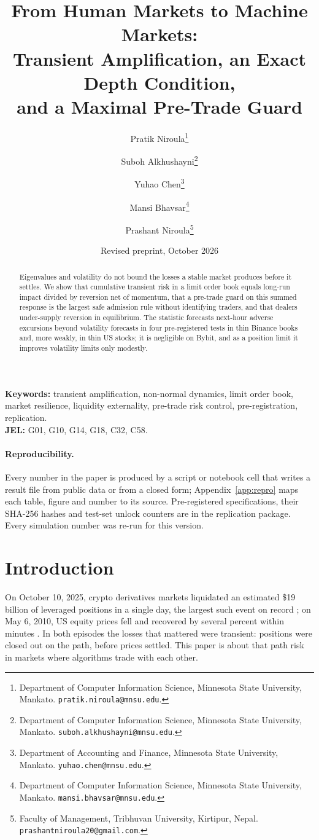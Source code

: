 \documentclass[12pt]{article}
\title{From Human Markets to Machine Markets:\\
Transient Amplification, an Exact Depth Condition,\\ and a Maximal Pre-Trade Guard}
\author{Pratik Niroula\thanks{Department of Computer Information Science, Minnesota State University, Mankato. \texttt{pratik.niroula@mnsu.edu}.}
\and Suboh Alkhushayni\thanks{Department of Computer Information Science, Minnesota State University, Mankato. \texttt{suboh.alkhushayni@mnsu.edu}.}
\and Yuhao Chen\thanks{Department of Accounting and Finance, Minnesota State University, Mankato. \texttt{yuhao.chen@mnsu.edu}.}
\and Mansi Bhavsar\thanks{Department of Computer Information Science, Minnesota State University, Mankato. \texttt{mansi.bhavsar@mnsu.edu}.}
\and Prashant Niroula\thanks{Faculty of Management, Tribhuvan University, Kirtipur, Nepal. \texttt{prashantniroula20@gmail.com}.}}
\date{Revised preprint, October 2026}
\theoremstyle{definition}
\theoremstyle{remark}
\begin{document}
\maketitle
\thispagestyle{empty}

\begin{abstract}
\noindent Eigenvalues and volatility do not bound the losses a stable market produces before it settles. We show that cumulative transient risk in a limit order book equals long-run impact divided by reversion net of momentum, that a pre-trade guard on this summed response is the largest safe admission rule without identifying traders, and that dealers under-supply reversion in equilibrium. The statistic forecasts next-hour adverse excursions beyond volatility forecasts in four pre-registered tests in thin Binance books and, more weakly, in thin US stocks; it is negligible on Bybit, and as a position limit it improves volatility limits only modestly.
\end{abstract}

\noindent\textbf{Keywords:} transient amplification, non-normal dynamics, limit order book, market resilience, liquidity externality, pre-trade risk control, pre-registration, replication.\\
\textbf{JEL:} G01, G10, G14, G18, C32, C58.

\paragraph{Reproducibility.} Every number in the paper is produced by a script or notebook cell that writes a result file from public data or from a closed form; Appendix~\ref{app:repro} maps each table, figure and number to its source. Pre-registered specifications, their SHA-256 hashes and test-set unlock counters are in the replication package. Every simulation number was re-run for this version.

\newpage
\setcounter{page}{1}

\section{Introduction}

On October 10, 2025, crypto derivatives markets liquidated an estimated \$19 billion of leveraged positions in a single day, the largest such event on record \citep{shares2025}; on May 6, 2010, US equity prices fell and recovered by several percent within minutes \citep{kirilenko2017}. In both episodes the losses that mattered were transient: positions were closed out on the path, before prices settled. This paper is about that path risk in markets where algorithms trade with each other.
\end{document}
